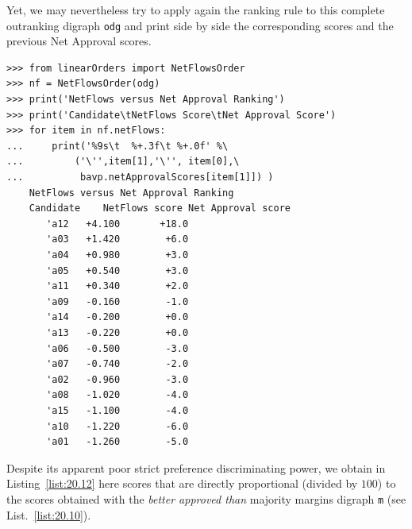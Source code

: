 Yet, we may nevertheless try to apply again the \NetFlows ranking rule to this complete outranking digraph \texttt{odg} and print side by side the corresponding \NetFlows scores and the previous Net Approval scores. 
\begin{lstlisting}[caption={Comparing the \NetFlows and the Net Approval rankings},label=list:20.12]
>>> from linearOrders import NetFlowsOrder
>>> nf = NetFlowsOrder(odg)
>>> print('NetFlows versus Net Approval Ranking')
>>> print('Candidate\tNetFlows Score\tNet Approval Score')
>>> for item in nf.netFlows:
...     print('%9s\t  %+.3f\t %+.0f' %\
...         ('\'',item[1],'\'', item[0],\
...          bavp.netApprovalScores[item[1]]) )  
    NetFlows versus Net Approval Ranking
    Candidate    NetFlows score	Net Approval score
       'a12	  +4.100	   +18.0
       'a03	  +1.420	    +6.0
       'a04	  +0.980	    +3.0
       'a05	  +0.540	    +3.0
       'a11	  +0.340	    +2.0
       'a09	  -0.160	    -1.0
       'a14	  -0.200	    +0.0
       'a13	  -0.220	    +0.0
       'a06	  -0.500	    -3.0
       'a07	  -0.740	    -2.0
       'a02	  -0.960	    -3.0
       'a08	  -1.020	    -4.0
       'a15	  -1.100	    -4.0
       'a10	  -1.220	    -6.0
       'a01	  -1.260	    -5.0
\end{lstlisting}
Despite its apparent poor strict preference discriminating power, we obtain in Listing~\vref{list:20.12} here \NetFlows scores that are directly proportional (divided by $100$) to the scores obtained with the \emph{better approved than} majority margins digraph \texttt{m} (see List.~\vref{list:20.10}).

